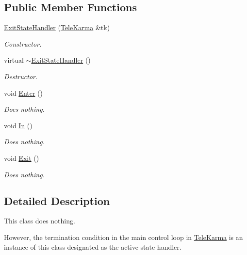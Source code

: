 \subsection*{Public Member Functions}
\begin{CompactItemize}
\item 
\hyperlink{classExitStateHandler_8504cb5ec7dfbd0f66351e0335f4ff38}{ExitStateHandler} (\hyperlink{classTeleKarma}{TeleKarma} \&tk)
\begin{CompactList}\small\item\em Constructor. \item\end{CompactList}\item 
virtual \hyperlink{classExitStateHandler_c793d8775665eb50fd36d88e8416ad9b}{$\sim$ExitStateHandler} ()
\begin{CompactList}\small\item\em Destructor. \item\end{CompactList}\item 
void \hyperlink{classExitStateHandler_a17a1677784b257819f1ec731d1e9bdb}{Enter} ()
\begin{CompactList}\small\item\em Does nothing. \item\end{CompactList}\item 
void \hyperlink{classExitStateHandler_b925619b8046b31d86795eaee6977aa0}{In} ()
\begin{CompactList}\small\item\em Does nothing. \item\end{CompactList}\item 
void \hyperlink{classExitStateHandler_0d6c713864949be9525cffb4522bb996}{Exit} ()
\begin{CompactList}\small\item\em Does nothing. \item\end{CompactList}\end{CompactItemize}


\subsection{Detailed Description}
This class does nothing. 

However, the termination condition in the main control loop in \hyperlink{classTeleKarma}{TeleKarma} is an instance of this class designated as the active state handler. 

